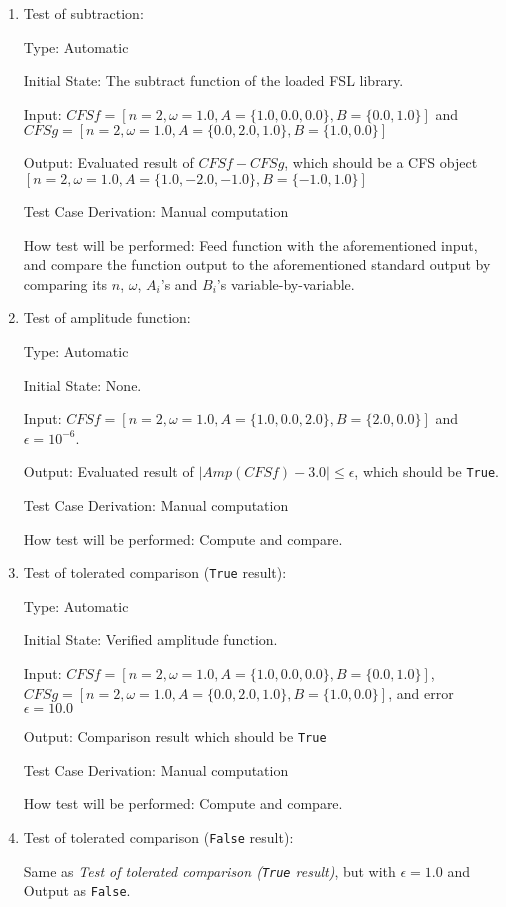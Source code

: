 \documentclass[12pt, titlepage]{article}
\newcommand{\li}[1]{\texttt{#1}}
\begin{document}
\begin{enumerate}
	
	\item{Test of subtraction: \\}
	
	Type: Automatic
	
	Initial State: The subtract function of the loaded FSL library.
	
	Input: $\mathit{CFSf}=[n=2, \omega=1.0, A=\{1.0, 0.0, 0.0\}, B=\{0.0, 1.0\}]$ and 
	$\mathit{CFSg}=[n=2, \omega=1.0, A=\{0.0, 2.0, 1.0\}, B=\{1.0, 0.0\}]$	 
	
	Output: Evaluated result of $\mathit{CFSf}-\mathit{CFSg}$, which should be a CFS object $[n=2, \omega=1.0, A=\{1.0, -2.0, -1.0\}, B=\{-1.0, 1.0\}]$
	
	Test Case Derivation: Manual computation
	
	How test will be performed: Feed function with the aforementioned input, and compare the function output to the aforementioned standard output by comparing its $n$, $\omega$, $A_i$'s and $B_i$'s variable-by-variable.
	
	\item{Test of amplitude function: \\}					
	
	Type: Automatic
	
	Initial State: None.
	
	Input: $\mathit{CFSf}=[n=2, \omega=1.0, A=\{1.0, 0.0, 2.0\}, B=\{2.0, 0.0\}]$ and $\epsilon=10^{-6}$.
	
	Output: Evaluated result of $|\mathit{Amp}(\mathit{CFSf})-3.0|\leq\epsilon$, which should be \li{True}.
	
	Test Case Derivation: Manual computation
	
	How test will be performed: Compute and compare.
	
	
	\item{Test of tolerated comparison  (\li{True} result): \\}
	
	Type: Automatic
	
	Initial State: Verified amplitude function.
	
	Input: $\mathit{CFSf}=[n=2, \omega=1.0, A=\{1.0, 0.0, 0.0\}, B=\{0.0, 1.0\}]$, 
	$\mathit{CFSg}=[n=2, \omega=1.0, A=\{0.0, 2.0, 1.0\}, B=\{1.0, 0.0\}]$, and error $\epsilon=10.0$
	
	Output: Comparison result which should be \li{True}
	
	Test Case Derivation: Manual computation
	
	How test will be performed: Compute and compare.
	
	\item{Test of tolerated comparison  (\li{False} result):\\}
	
	Same as \textit{Test of tolerated comparison  (\li{True} result)}, but with $\epsilon=1.0$ and Output as \li{False}.    
\end{enumerate}
\end{document}

